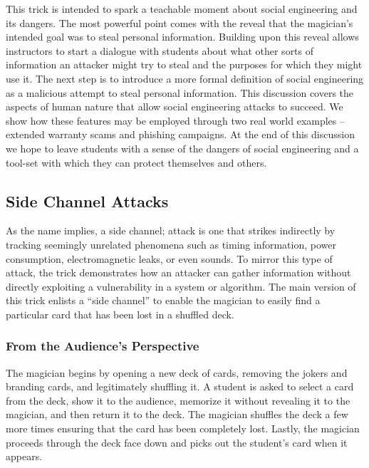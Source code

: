 This trick is intended to spark a teachable moment about social engineering and
its dangers.  The most powerful point comes with the reveal that the magician's
intended goal was to steal personal information.
Building upon this reveal allows instructors to start a dialogue with
students about what other
sorts of information an attacker might try to steal and the purposes for which
they might use it.
The next step is to introduce a more formal definition of social engineering as
a malicious attempt to steal personal information.
This discussion covers the aspects of human nature that allow social engineering
attacks to succeed.  We show how these features may be employed through two real world examples -- extended
warranty scams and phishing campaigns.
At the end of this discussion we hope to leave students with a sense of the
dangers of social engineering and a tool-set with which they can protect
themselves and others.

\subsection{Side Channel Attacks}

As the name implies, a side channel; attack is one that strikes indirectly
by tracking seemingly unrelated phenomena
such as timing information, power consumption, electromagnetic leaks, or even
sounds.  To mirror this type of attack, the trick
demonstrates how an attacker can
gather information without directly exploiting
a vulnerability in a system or algorithm.
The main version of this trick enlists a ``side channel'' to
enable the magician to easily
find a particular card that has been lost in a shuffled deck.

\subsubsection{From the Audience's Perspective}

The magician begins by opening a new deck of cards, removing the jokers and
branding cards, and legitimately shuffling it.  A student is asked to
select a card from the deck, show it to the audience, memorize it without
revealing it to the magician, and then return it to the deck.
The magician shuffles the deck a few more times ensuring that the card has
been completely lost.
Lastly, the magician proceeds through the deck face down and picks out the
student's card when it appears.

